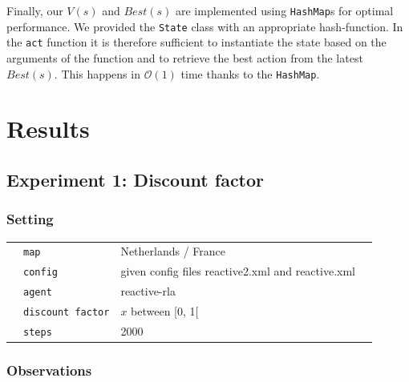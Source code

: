 \documentclass[11pt]{article}
\begin{document}
Finally, our $V(s)$ and $Best(s)$ are implemented using \texttt{HashMap}s for 
optimal performance. We provided the \texttt{State} class with an appropriate 
hash-function. In the \texttt{act} function it is therefore sufficient to instantiate 
the state based on the arguments of the function and to retrieve the best action 
from the latest $Best(s)$. This happens in $\mathcal{O}(1)$ time thanks to the 
\texttt{HashMap}.


\section{Results}

\subsection{Experiment 1: Discount factor}

\subsubsection{Setting}
 \begin{table}[H]
  \begin{tabular}{llll}
   &\texttt{map }  &Netherlands / France\\
   &\texttt{config}  & given config files reactive2.xml and reactive.xml \\
   &\texttt{agent}  &reactive-rla\\
   &\texttt{discount factor}  &$x$ between [0, 1[\\
   &\texttt{steps}  &2000
  \end{tabular}
 \end{table}

\subsubsection{Observations}
\end{document}
